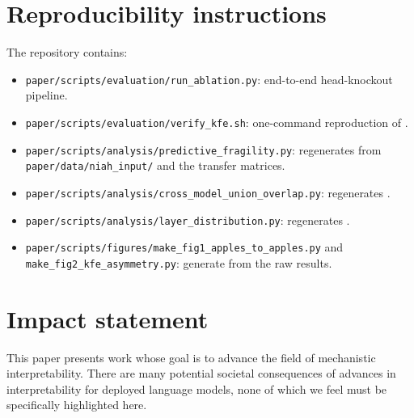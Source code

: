 \documentclass{article}
\theoremstyle{plain}
\theoremstyle{definition}
\theoremstyle{remark}
\begin{document}
\section{Reproducibility instructions}

The repository contains:
\begin{itemize}
\itemsep0pt
\item \texttt{paper/scripts/evaluation/run\_ablation.py}: end-to-end head-knockout pipeline.
\item \texttt{paper/scripts/evaluation/verify\_kfe.sh}: one-command reproduction of .
\item \texttt{paper/scripts/analysis/predictive\_fragility.py}: regenerates  from \texttt{paper/data/niah\_input/} and the transfer matrices.
\item \texttt{paper/scripts/analysis/cross\_model\_union\_overlap.py}: regenerates .
\item \texttt{paper/scripts/analysis/layer\_distribution.py}: regenerates .
\item \texttt{paper/scripts/figures/make\_fig1\_apples\_to\_apples.py} and \texttt{make\_fig2\_kfe\_asymmetry.py}: generate  from the raw results.
\end{itemize}

\section*{Impact statement}
This paper presents work whose goal is to advance the field of mechanistic interpretability. There are many potential societal consequences of advances in interpretability for deployed language models, none of which we feel must be specifically highlighted here.
\end{document}

